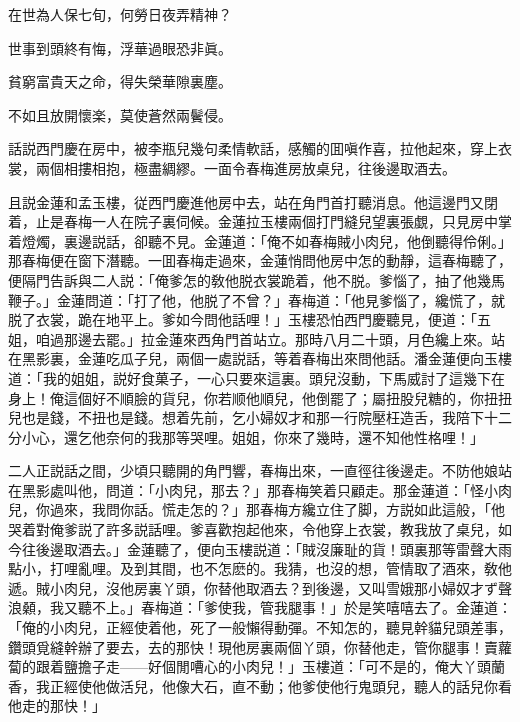 在世為人保七旬，何勞日夜弄精神？

世事到頭終有悔，浮華過眼恐非眞。

貧窮富貴天之命，得失榮華隙裏塵。

不如且放開懷楽，莫使蒼然兩鬢侵。

話説西門慶在房中，被李瓶兒幾句柔情軟話，感觸的囬嗔作喜，拉他起來，穿上衣裳，兩個相摟相抱，極盡綢繆。一面令春梅進房放桌兒，往後邊取酒去。

且説金蓮和孟玉樓，従西門慶進他房中去，站在角門首打聽消息。他這邊門又閉着，止是春梅一人在院子裏伺候。金蓮拉玉樓兩個打門縫兒望裏張覷，只見房中掌着燈燭，裏邊説話，卻聽不見。金蓮道：「俺不如春梅賊小肉兒，他倒聽得伶俐。」那春梅便在窗下潛聽。一囬春梅走過來，金蓮悄問他房中怎的動靜，這春梅聽了，便隔門告訴與二人説：「俺爹怎的敎他脱衣裳跪着，他不脱。爹惱了，抽了他幾馬鞭子。」金蓮問道：「打了他，他脱了不曾？」春梅道：「他見爹惱了，纔慌了，就脱了衣裳，跪在地平上。爹如今問他話哩！」玉樓恐怕西門慶聽見，便道：「五姐，咱過那邊去罷。」拉金蓮來西角門首站立。那時八月二十頭，月色纔上來。站在黑影裏，金蓮吃瓜子兒，兩個一處説話，等着春梅出來問他話。潘金蓮便向玉樓道：「我的姐姐，説好食菓子，一心只要來這裏。頭兒沒動，下馬威討了這幾下在身上！俺這個好不順臉的貨兒，你若顺他順兒，他倒罷了；屬扭股兒糖的，你扭扭兒也是錢，不扭也是錢。想着先前，乞小婦奴才和那一行院壓枉造舌，我陪下十二分小心，還乞他奈何的我那等哭哩。姐姐，你來了幾時，還不知他性格哩！」

二人正説話之間，少頃只聽開的角門響，春梅出來，一直徑往後邊走。不防他娘站在黑影處叫他，問道：「小肉兒，那去？」那春梅笑着只顧走。那金蓮道：「怪小肉兒，你過來，我問你話。慌走怎的？」那春梅方纔立住了脚，方説如此這般，「他哭着對俺爹説了許多説話哩。爹喜歡抱起他來，令他穿上衣裳，教我放了桌兒，如今往後邊取酒去。」金蓮聽了，便向玉樓説道：「賊沒廉耻的貨！頭裏那等雷聲大雨點小，打哩亂哩。及到其間，也不怎麽的。我猜，也沒的想，管情取了酒來，敎他遞。賊小肉兒，沒他房裏丫頭，你替他取酒去？到後邊，又叫雪娥那小婦奴才ず聲浪顙，我又聽不上。」春梅道：「爹使我，管我腿事！」於是笑嘻嘻去了。金蓮道：「俺的小肉兒，正經使着他，死了一般懶得動彈。不知怎的，聽見幹貓兒頭差事，鑽頭覓縫幹辦了要去，去的那快！現他房裏兩個丫頭，你替他走，管你腿事！賣蘿蔔的跟着鹽擔子走——好個閒嘈心的小肉兒！」玉樓道：「可不是的，俺大丫頭蘭香，我正經使他做活兒，他像大石，直不動；他爹使他行鬼頭兒，聽人的話兒你看他走的那快！」

